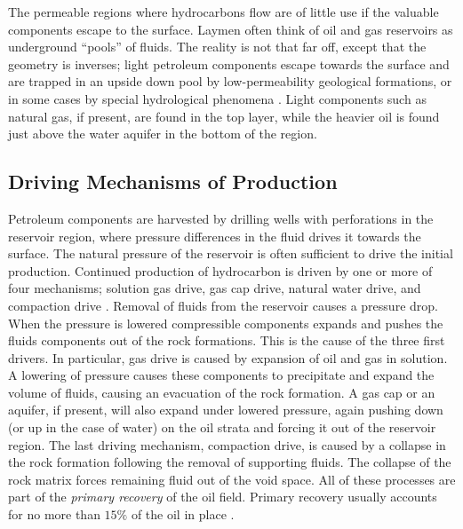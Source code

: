 The permeable regions where hydrocarbons flow are of little use if the valuable components escape to the surface. Laymen often think of oil and gas reservoirs as underground ``pools'' of fluids. The reality is not that far off, except that the geometry is inverses;  light petroleum components escape towards the surface and are trapped in an upside down pool by low-permeability geological formations, or in some cases by special hydrological phenomena \citep{jain_ch._2013}. Light components such as natural gas, if present, are found in the top layer, while the heavier oil is found just above the water aquifer in the bottom of the region.
\subsection{Driving Mechanisms of Production}
Petroleum components are harvested by drilling wells with perforations in the reservoir region, where pressure differences in the fluid drives it towards the surface. The natural pressure of the reservoir is often sufficient to drive the initial production. Continued production of hydrocarbon is driven by one or more of four mechanisms; solution gas drive, gas cap drive, natural water drive, and compaction drive \citep{dake_fundamentals_1978}. Removal of fluids from the reservoir causes a pressure drop. When the pressure is lowered compressible components expands and pushes the fluids components out of the rock formations. This is the cause of the three first drivers. In particular, gas drive is caused by expansion of oil and gas in solution. A lowering of pressure causes these components to precipitate and expand the volume of fluids, causing an evacuation of the rock formation. A gas cap or an aquifer, if present, will also expand under lowered pressure, again pushing down (or up in the case of water) on the oil strata and forcing it out of the reservoir region. The last driving mechanism, compaction drive, is caused by a collapse in the rock formation following the removal of supporting fluids. The collapse of the rock matrix forces remaining fluid out of the void space. All of these processes are part of the \emph{primary recovery} of the oil field. Primary recovery usually accounts for no more than $15\%$ of the oil in place \citep{tzimas_enhanced_2005}.


